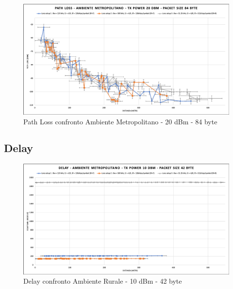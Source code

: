 \documentclass[12pt,a4paper,openright,twoside]{report}
\begin{document}
\begin{figure}[h]                      
\begin{center} 
\includegraphics[width=\textwidth]{PATH_LOSS_confronto_AM_20dBm_84byte.png}
\caption[Path Loss confronto Ambiente Metropolitano - 20 dBm - 84 byte]{Path Loss confronto Ambiente Metropolitano - 20 dBm - 84 byte}\label{fig:prima}
\end{center}
\end{figure}


\subsection{Delay}
\begin{figure}[h]                      
\begin{center} 
\includegraphics[width=\textwidth]{DELAY_confronto_AM_10dBm_42byte.png}
\caption[Delay confronto Ambiente Rurale - 10 dBm - 42 byte]{Delay confronto Ambiente Rurale - 10 dBm - 42 byte}\label{fig:prima}
\end{center}
\end{figure}
\end{document}
